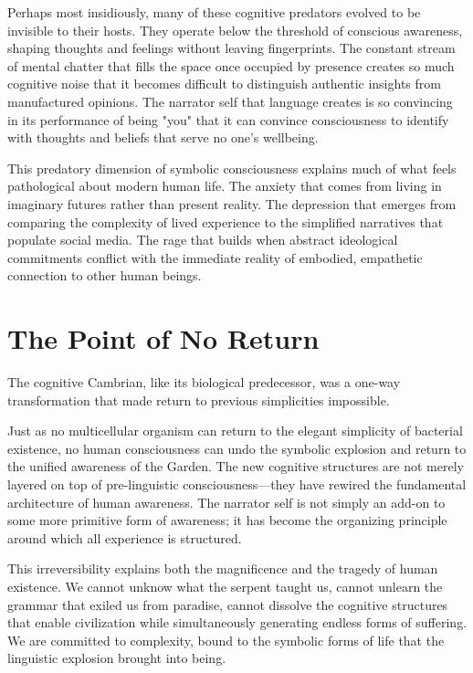 Perhaps most insidiously, many of these cognitive predators evolved to be invisible to their hosts. They operate below the threshold of conscious awareness, shaping thoughts and feelings without leaving fingerprints. The constant stream of mental chatter that fills the space once occupied by presence creates so much cognitive noise that it becomes difficult to distinguish authentic insights from manufactured opinions. The narrator self that language creates is so convincing in its performance of being "you" that it can convince consciousness to identify with thoughts and beliefs that serve no one's wellbeing.

This predatory dimension of symbolic consciousness explains much of what feels pathological about modern human life. The anxiety that comes from living in imaginary futures rather than present reality. The depression that emerges from comparing the complexity of lived experience to the simplified narratives that populate social media. The rage that builds when abstract ideological commitments conflict with the immediate reality of embodied, empathetic connection to other human beings.

\section{The Point of No Return}

The cognitive Cambrian, like its biological predecessor, was a one-way transformation that made return to previous simplicities impossible.

Just as no multicellular organism can return to the elegant simplicity of bacterial existence, no human consciousness can undo the symbolic explosion and return to the unified awareness of the Garden. The new cognitive structures are not merely layered on top of pre-linguistic consciousness—they have rewired the fundamental architecture of human awareness. The narrator self is not simply an add-on to some more primitive form of awareness; it has become the organizing principle around which all experience is structured.

This irreversibility explains both the magnificence and the tragedy of human existence. We cannot unknow what the serpent taught us, cannot unlearn the grammar that exiled us from paradise, cannot dissolve the cognitive structures that enable civilization while simultaneously generating endless forms of suffering. We are committed to complexity, bound to the symbolic forms of life that the linguistic explosion brought into being.

